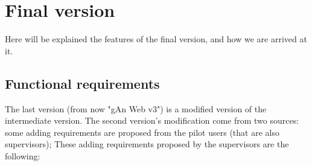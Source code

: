 
\chapter{Final version} %

\label{Chapter5} %

Here will be explained the features of the final version, and how we are arrived at it.

\section{Functional requirements}

The last version (from now "gAn Web v3") is a modified version of the intermediate version. 
The second version's modification come from two sources: some adding requirements are proposed from the pilot users (that are also supervisors); These adding requirements proposed by the supervisors are the following:

